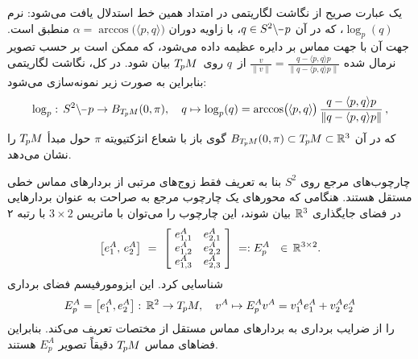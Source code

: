یک عبارت صریح از نگاشت لگاریتمی در امتداد همین خط استدلال یافت می‌شود:
نرم $\log_p(q)$، که در آن $q\in {S^2 \backslash \mkern-1mu\minus\mkern1mu p}$، با زاویه دوران $\alpha = \arccos\!\big( \langle p,q\rangle \big)$ منطبق است.
جهت آن با جهت مماس بر دایره عظیمه داده می‌شود، که ممکن است بر حسب تصویر نرمال شده
$\frac{v}{\lVert v\rVert} = \frac{q - \langle p,q\rangle p}{\lVert q - \langle p,q\rangle p\rVert}$
از~$q$ روی~$T_{\mkern-1.5mu p}\mkern-.5muM$ بیان شود.
در کل، نگاشت لگاریتمی بنابراین به صورت زیر نمونه‌سازی می‌شود:
\begin{align}\label{eq:sphere_logmap_explicit}
    \log_p:\, S^2\backslash \mkern-1mu\minus\mkern1mu p \to B_{\TpM}(0,\pi), \quad
    q \mapsto \log_p(q) = \arccos\!\big( \mkern-1mu\langle p,q\rangle \mkern-1mu\big) \, \frac{q - \langle p,q\rangle p}{\lVert q - \langle p,q\rangle p\rVert} \,,
\end{align}
که در آن $B_{T_{\mkern-1.5mu p}\mkern-.5muM}(0,\pi) \subset T_{\mkern-1.5mu p}\mkern-.5muM \subset \mathbb{R}^3$ گوی باز با شعاع انژکتیویته $\pi$ حول مبدأ $T_{\mkern-1.5mu p}\mkern-.5muM$ را نشان می‌دهد.


چارچوب‌های مرجع روی $S^2$ بنا به تعریف فقط زوج‌های مرتبی از بردارهای مماس خطی مستقل هستند.
هنگامی که محورهای یک چارچوب مرجع به صراحت به عنوان بردارهایی در فضای جایگذاری $\mathbb{R}^3$ بیان شوند، این چارچوب را می‌توان با ماتریس $3\times 2$ با رتبه ۲
\begin{align}\label{eq:embedding_space_R3_frame}
    \big[ e_1^A,\, e_2^A \big]\ =\ 
    \left[\! \begin{array}{cc}
        e^A_{1,1} & e^A_{2,1} \\
        e^A_{1,2} & e^A_{2,2} \\
        e^A_{1,3} & e^A_{2,3}
    \end{array} \!\right]
    \; =: E^A_p
    \ \ \in\, \R^{3\times2} .
\end{align}
شناسایی کرد. این ایزومورفیسم فضای برداری
\begin{align}
    E^A_p = \big[ e_1^A, e_2^A \big]:\, \mathbb{R}^2 \to T_{\mkern-1.5mu p}\mkern-.5muM,\ \ \ v^A \mapsto E^A_p v^A = v^A_1 e^A_1 + v^A_2 e^A_2
\end{align}
را از ضرایب برداری به بردارهای مماس مستقل از مختصات تعریف می‌کند.
بنابراین فضاهای مماس $T_{\mkern-1.5mu p}\mkern-.5muM$ دقیقاً تصویر $E^A_p$ هستند.


